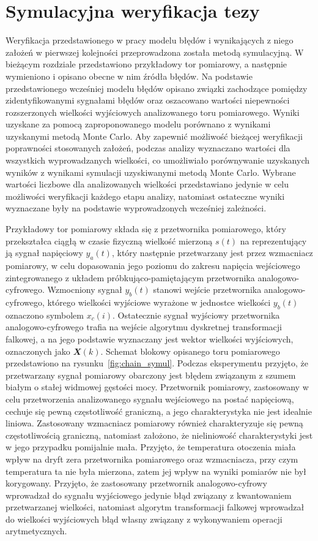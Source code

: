 \chapter{Symulacyjna weryfikacja tezy}

Weryfikacja przedstawionego w pracy modelu błędów i wynikających z niego założeń w pierwszej kolejności przeprowadzona została metodą symulacyjną. W bieżącym rozdziale przedstawiono przykładowy tor pomiarowy, a następnie wymieniono i opisano obecne w nim źródła błędów. Na podstawie przedstawionego wcześniej modelu błędów opisano związki zachodzące pomiędzy zidentyfikowanymi sygnałami błędów oraz oszacowano wartości niepewności rozszerzonych wielkości wyjściowych analizowanego toru pomiarowego. Wyniki uzyskane za pomocą zaproponowanego modelu porównano z wynikami uzyskanymi metodą Monte Carlo. Aby zapewnić możliwość bieżącej weryfikacji poprawności stosowanych założeń, podczas analizy wyznaczano wartości dla wszystkich wyprowadzanych wielkości, co umożliwiało porównywanie uzyskanych wyników z wynikami symulacji uzyskiwanymi metodą Monte Carlo. Wybrane wartości liczbowe dla analizowanych wielkości przedstawiano jedynie w celu możliwości weryfikacji każdego etapu analizy, natomiast ostateczne wyniki wyznaczane były na podstawie wyprowadzonych wcześniej zależności.

Przykładowy tor pomiarowy składa się z przetwornika pomiarowego, który przekształca ciągłą w czasie fizyczną wielkość mierzoną $s(t)$ na reprezentujący ją sygnał napięciowy $y_{a}(t)$, który następnie przetwarzany jest przez wzmacniacz pomiarowy, w celu dopasowania jego poziomu do zakresu napięcia wejściowego zintegrowanego z układem próbkująco-pamiętającym przetwornika analogowo-cyfrowego. Wzmocniony sygnał $y_{b}(t)$ stanowi wejście przetwornika analogowo-cyfrowego, którego wielkości wyjściowe wyrażone w jednostce wielkości $y_{b}(t)$ oznaczono symbolem $x_{c}(i)$. Ostatecznie sygnał wyjściowy przetwornika analogowo-cyfrowego trafia na wejście algorytmu dyskretnej transformacji falkowej, a na jego podstawie wyznaczany jest wektor wielkości wyjściowych, oznaczonych jako $\mathbfit{X}(k)$. Schemat blokowy opisanego toru pomiarowego przedstawiono na rysunku~\ref{fig:chain_symul}. Podczas eksperymentu przyjęto, że przetwarzany sygnał pomiarowy obarczony jest błędem związanym z szumem białym o stałej widmowej gęstości mocy. Przetwornik pomiarowy, zastosowany w celu przetworzenia analizowanego sygnału wejściowego na postać napięciową, cechuje się pewną częstotliwość graniczną, a jego charakterystyka nie jest idealnie liniowa. Zastosowany wzmacniacz pomiarowy również charakteryzuje się pewną częstotliwością graniczną, natomiast założono, że nieliniowość charakterystyki jest w jego przypadku pomijalnie mała. Przyjęto, że temperatura otoczenia miała wpływ na dryft zera przetwornika pomiarowego oraz wzmacniacza, przy czym temperatura ta nie była mierzona, zatem jej wpływ na wyniki pomiarów nie był korygowany. Przyjęto, że zastosowany przetwornik analogowo-cyfrowy wprowadzał do sygnału wyjściowego jedynie błąd związany z kwantowaniem przetwarzanej wielkości, natomiast algorytm transformacji falkowej wprowadzał do wielkości wyjściowych błąd własny związany z wykonywaniem operacji arytmetycznych.

